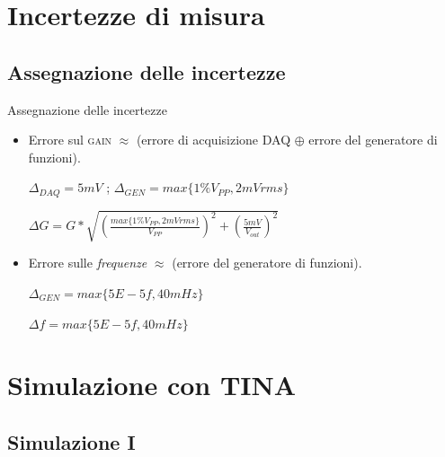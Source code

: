 \documentclass{beamer}
\begin{document}
\section{Incertezze di misura}

\subsection{Assegnazione delle incertezze}

\begin{frame}{Assegnazione delle incertezze}
\begin{itemize}
\item Errore sul \textsc{gain} $ \approx $ (errore di acquisizione DAQ $ \oplus $ errore del generatore di funzioni).

\begin{definition}
$ \Delta _{DAQ} = 5 mV$ ; $ \Delta _{GEN} = max\{1 \% V_{PP}, 2\si{mV}rms\}$
\end{definition}

\begin{example}
$\Delta G = G * \sqrt{(\frac{max\{1 \% V_{PP}, 2\si{mV}rms\}}{V_{PP}})^2 + (\frac{5\si{mV}}{V_{out}})^2}$
\end{example}


\item Errore sulle \textit{frequenze} $ \approx $ (errore del generatore di funzioni).

\begin{definition}
$ \Delta _{GEN} = max\{5E-5  f, 40\si{mHz}\}$
\end{definition}

\begin{example}
$\Delta f = max\{5E-5 f, 40\si{mHz}\} $
\end{example}

\end{itemize}
\end{frame}

\section{Simulazione con TINA}


\subsection{Simulazione I}
\end{document}
